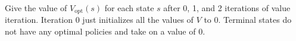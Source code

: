 \item {}
Give the value of $V_\text{opt}(s)$ for each state $s$ after 0, 1, and 2
iterations of value iteration. Iteration 0 just initializes all the values of
$V$ to 0. Terminal states do not have any optimal policies and take on a value
of 0.
